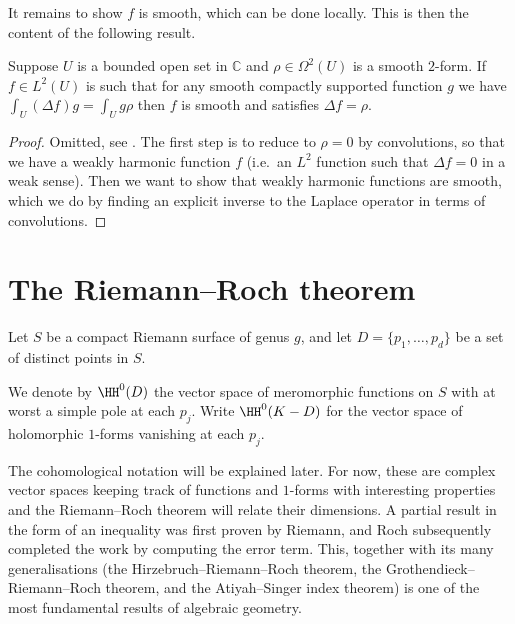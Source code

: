 It remains to show \(f\) is smooth, which can be done locally. This is then the
content of the following result.

\begin{proposition}
    Suppose \(U\) is a bounded open set in \(\mathbb{C}\) and \(\rho\in
    \Omega^2(U)\) is a smooth \(2\)-form. If \(f\in L^2(U)\) is such that for
    any smooth compactly supported function \(g\) we have \(\int_U (\Delta f)g =
    \int_U g\rho\) then \(f\) is smooth and satisfies \(\Delta f = \rho\).

    \begin{proof}
        Omitted, see \cite{donaldsonRiemannSurfaces}. The first step is to
        reduce to \(\rho=0\) by convolutions, so that we have a weakly harmonic
        function \(f\) (i.e.\ an \(L^2\) function such that \(\Delta f=0\) in a
        weak sense). Then we want to show that weakly harmonic functions are
        smooth, which we do by finding an explicit inverse to the Laplace
        operator in terms of convolutions.
    \end{proof}
\end{proposition}

\section{The Riemann--Roch theorem}
 Let \(S\) be a compact Riemann surface of genus \(g\), and let
\(D=\{p_1,\ldots,p_d\}\) be a set of distinct points in \(S\).

\begin{definition}
    We denote by \(\HH^0(D)\) the vector space of meromorphic functions on
    \(S\) with at worst a simple pole at each \(p_j\). Write
    \(\HH^0(K-D)\) for the vector space of holomorphic \(1\)-forms vanishing
    at each \(p_j\).
\end{definition}

The cohomological notation will be explained later. For now, these are complex
vector spaces keeping track of functions and \(1\)-forms with interesting
properties and the Riemann--Roch theorem will relate their dimensions. A partial
result in the form of an inequality was first proven by Riemann, and Roch
subsequently completed the work by computing the error term. This, together with
its many generalisations (the Hirzebruch--Riemann--Roch theorem, the
Grothendieck--Riemann--Roch theorem, and the Atiyah--Singer index theorem) is
one of the most fundamental results of algebraic geometry.

